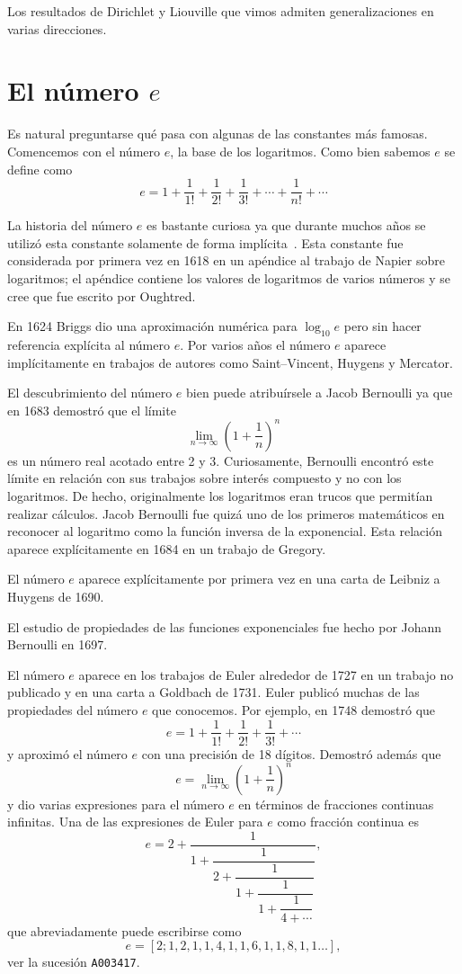 Los resultados de Dirichlet y Liouville que vimos admiten generalizaciones en
varias direcciones. 


\section*{El número $e$}

Es natural preguntarse qué pasa con algunas de las constantes más famosas.
Comencemos con el número $e$, la base de los logaritmos.  Como bien sabemos $e$
se define como
\[
	e=1+\frac{1}{1!}+\frac{1}{2!}+\frac{1}{3!}+\cdots+\frac{1}{n!}+\cdots
\]

La historia del número $e$ es bastante curiosa ya que durante muchos años se
utilizó esta constante solamente de forma implícita~\cite{MR38289}. Esta constante fue
considerada por primera vez en 1618 en un apéndice al trabajo de Napier 
sobre logaritmos; el apéndice contiene los valores de logaritmos de varios
números y se cree que fue escrito por Oughtred. 

En 1624 Briggs dio una
aproximación numérica para $\log_{10}e$ pero sin hacer referencia explícita al
número $e$. Por varios años el número $e$ aparece implícitamente en trabajos de
autores como Saint--Vincent, Huygens y Mercator.  

El descubrimiento del número
$e$ bien puede atribuírsele a Jacob Bernoulli ya que en 1683 demostró que el
límite 
\[
	\lim_{n\to\infty}\left(1+\frac1n\right)^n
\]
es un número real acotado entre 2 y 3. Curiosamente, Bernoulli encontró este
límite en relación con sus trabajos sobre interés compuesto y no con los
logaritmos. De hecho, originalmente los logaritmos eran trucos que permitían
realizar cálculos. Jacob Bernoulli fue quizá uno de los primeros matemáticos en
reconocer al logaritmo como la función inversa de la exponencial. Esta relación
aparece explícitamente en 1684 en un trabajo de Gregory.

El número $e$ aparece explícitamente por primera vez en una carta de Leibniz a
Huygens de 1690. 

El estudio de propiedades de las funciones exponenciales fue
hecho por Johann Bernoulli en 1697. 

El número $e$ aparece en los trabajos de Euler 
alrededor de 1727 en un trabajo no publicado y 
en una carta a Goldbach de 1731. Euler publicó muchas de las propiedades del
número $e$ que conocemos. Por ejemplo, en 1748 demostró que 
\[
	e=1+\frac{1}{1!}+\frac{1}{2!}+\frac{1}{3!}+\cdots
\]
y aproximó el número $e$ con una precisión de 18 dígitos. Demostró además que 
\[
	e=\lim_{n\to\infty}\left(1+\frac1n\right)^n
\]
y dio varias expresiones para el número $e$ en términos de fracciones continuas
infinitas. Una de las expresiones de Euler para $e$ como fracción continua es 
\[
	e=2+\dfrac{1}{1+\dfrac{1}{2+\dfrac{1}{1+\dfrac{1}{1+\dfrac{1}{4+\cdots}}}}},
\]
que abreviadamente puede escribirse como
\[
	e = [2;1,2,1,1,4,1,1,6,1,1,8,1,1\dots],
\]
ver la sucesión \verb+A003417+.

